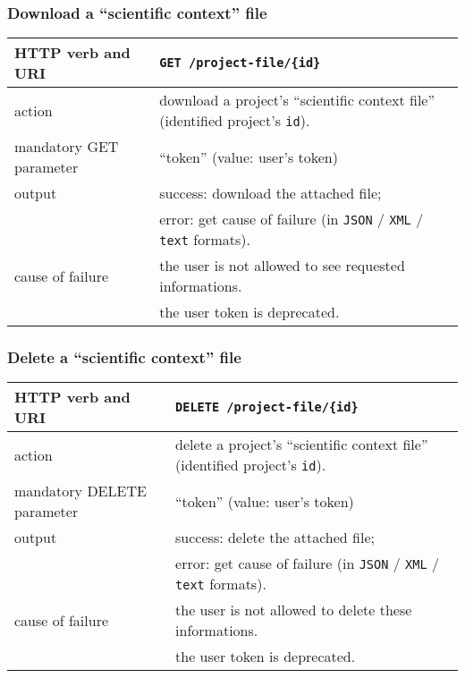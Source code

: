 \subsubsection{Download a ``scientific context'' file}
\begin{tabular}{ | l | l | }
	\hline
	HTTP verb and URI & \texttt{GET /project-file/\{id\}} \\
	\hline
	action & download a project's ``scientific context file'' (identified \via project's \texttt{id}). \\
	\hline
	mandatory GET parameter & ``token'' (value: user's token) \\
	\hline
	output & success: download the attached file; \\
	\space & error: get cause of failure (in \texttt{JSON} / \texttt{XML} / \texttt{text} formats). \\
	\hline
	cause of failure & the user is not allowed to see requested informations. \\
	\space & the user token is deprecated. \\
	\hline
\end{tabular}
\newline

\subsubsection{Delete a ``scientific context'' file}
\begin{tabular}{ | l | l | }
	\hline
	HTTP verb and URI & \texttt{DELETE /project-file/\{id\}} \\
	\hline
	action & delete a project's ``scientific context file'' (identified \via project's \texttt{id}). \\
	\hline
	mandatory DELETE parameter & ``token'' (value: user's token) \\
	\hline
	output & success: delete the attached file; \\
	\space & error: get cause of failure (in \texttt{JSON} / \texttt{XML} / \texttt{text} formats). \\
	\hline
	cause of failure & the user is not allowed to delete these informations. \\
	\space & the user token is deprecated. \\
	\hline
\end{tabular}
\newline

